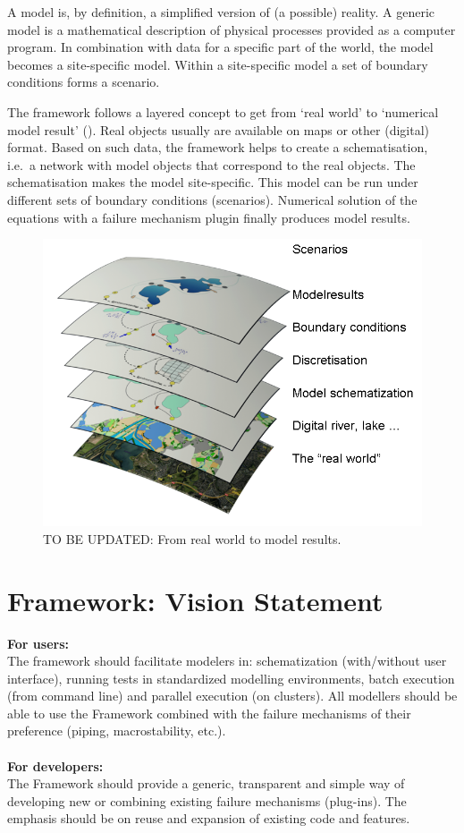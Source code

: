 A model is, by definition, a simplified version of (a possible) reality. A generic model is a mathematical description of physical processes provided as a computer program. In combination with data for a specific part of the world, the model becomes a site-specific model. Within a site-specific model a set of boundary conditions forms a scenario.

The framework follows a layered concept to get from `real world' to `numerical model result' ().
Real objects usually are available on maps or other (digital) format.
Based on such data, the framework helps to create a schematisation, i.e.\ a network with model objects that correspond to the real objects.
The schematisation makes the model site-specific.
This model can be run under different sets of boundary conditions (scenarios).
Numerical solution of the equations with a failure mechanism plugin finally produces model results.
%
\begin{figure} [H]
	\centering
		\includegraphics[width=\textwidth]{Figures/Chapter_background/DeltaShell_layers}
	\caption{TO BE UPDATED: From real world to model results.}
	\label{fig:fig2.0}
\end{figure}

\section{Framework: Vision Statement}
\label{sec:vision}
\textbf{For users:}\\
The framework should facilitate modelers in: schematization (with/without user interface), running tests in standardized modelling environments, batch execution (from command line) and parallel execution (on clusters). All modellers should be able to use the Framework combined with the failure mechanisms of their preference (piping, macrostability, etc.). \\\\
\textbf{For developers:}\\
The Framework should provide a generic, transparent and simple way of developing new or combining existing failure mechanisms (plug-ins). The emphasis should be on reuse and expansion of existing code and features.   

